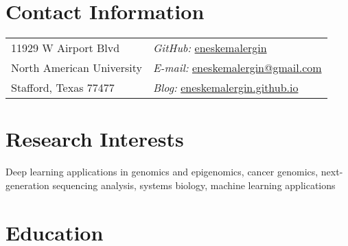 \documentclass[margin,line]{res}
\newenvironment{list1}{
  \begin{list}{\ding{113}}{%
      \setlength{\itemsep}{0in}
      \setlength{\parsep}{0in} \setlength{\parskip}{0in}
      \setlength{\topsep}{0in} \setlength{\partopsep}{0in} 
      \setlength{\leftmargin}{0.17in}}}{\end{list}}
\newenvironment{list2}{
  \begin{list}{$\bullet$}{%
      \setlength{\itemsep}{0in}
      \setlength{\parsep}{0in} \setlength{\parskip}{0in}
      \setlength{\topsep}{0in} \setlength{\partopsep}{0in} 
      \setlength{\leftmargin}{0.2in}}}{\end{list}}
\begin{document}

\begin{resume}
\section{\sc Contact Information}
\vspace{.05in}
\begin{tabular}{@{}p{2in}p{4in}}
11929 W Airport Blvd         & \hfill {\it GitHub:}  \href{https://github.com/eneskemalergin}{eneskemalergin} \\
North American University    & \hfill {\it E-mail:}  \href{mailto:eneskemalergin@gmail.com}{eneskemalergin@gmail.com}\\
Stafford, Texas 77477        & \hfill {\it Blog:}  \href{eneskemalergin.github.io}{eneskemalergin.github.io} \\
\end{tabular}


\section{\sc Research Interests}
Deep learning applications in genomics and epigenomics, cancer genomics, next-generation sequencing analysis, systems biology, machine learning applications

\section{\sc Education}

%


\end{resume}
\end{document}
